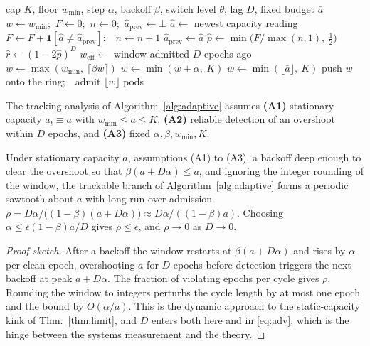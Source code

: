 \begin{algorithm}[t]
\caption{Adaptive admission for one contended unit}
\label{alg:adaptive}
\begin{algorithmic}[1]
\Require cap $K$, floor $w_{\min}$, step $\alpha$, backoff $\beta$, switch level
$\theta$, lag $D$, fixed budget $\bar a$
\State $w \gets w_{\min}$;\ $F \gets 0$;\ $n \gets 0$;\ $\hat a_{\mathrm{prev}} \gets \bot$
  \State $\hat a \gets$ newest capacity reading 
    \State $F \gets F + \mathbf 1[\hat a \neq \hat a_{\mathrm{prev}}]$;\ \ $n \gets n+1$
  \EndIf
  \State $\hat a_{\mathrm{prev}} \gets \hat a$
  \State $\hat p \gets \min\!\big(F/\max(n,1),\ \tfrac12\big)$
  \State $\hat r \gets (1-2\hat p)^{D}$
   
    \State $w_{\mathrm{eff}} \gets$ window admitted $D$ epochs ago
     
      \State $w \gets \max(w_{\min},\ \lceil \beta w \rceil)$
    \Else
      \State $w \gets \min(w + \alpha,\ K)$
    \EndIf
  \Else {}
    \State $w \gets \min(\lfloor \bar a \rfloor,\ K)$
  \EndIf
  \State push $w$ onto the ring;\ \ admit $\lfloor w \rfloor$ pods
\EndFor
\end{algorithmic}
\end{algorithm}

The tracking analysis of Algorithm~\ref{alg:adaptive} assumes \textbf{(A1)}
stationary capacity $a_t\equiv a$ with $w_{\min}\le a\le K$, \textbf{(A2)}
reliable detection of an overshoot within $D$ epochs, and \textbf{(A3)} fixed
$\alpha,\beta,w_{\min},K$.

\begin{proposition}\label{prop:bound}
Under stationary capacity $a$, assumptions (A1) to (A3), a backoff deep enough to
clear the overshoot so that $\beta(a+D\alpha)\le a$, and ignoring the integer
rounding of the window, the trackable branch of Algorithm~\ref{alg:adaptive} forms
a periodic sawtooth about $a$ with long-run over-admission $\rho=D\alpha/\big((1-\beta)(a+D\alpha)\big)\approx
D\alpha/((1-\beta)a)$. Choosing $\alpha\le\epsilon(1-\beta)a/D$ gives
$\rho\le\epsilon$, and $\rho\to0$ as $D\to0$.
\end{proposition}
\begin{proof}[Proof sketch]
After a backoff the window restarts at $\beta(a+D\alpha)$ and rises by $\alpha$
per clean epoch, overshooting $a$ for $D$ epochs before detection triggers the
next backoff at peak $a+D\alpha$. The fraction of violating epochs per cycle gives $\rho$. Rounding the window to
integers perturbs the cycle length by at most one epoch and the bound by
$O(\alpha/a)$. This is the dynamic approach to the static-capacity kink of
Thm.~\ref{thm:limit}, and $D$ enters both here and in \eqref{eq:adv}, which is the
hinge between the systems measurement and the theory.
\end{proof}

